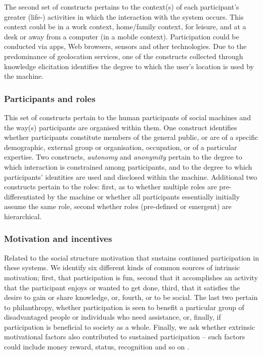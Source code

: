 \documentclass{sig-alternate}
\begin{document}
The second set of constructs pertains to the context(s) of each participant's greater (life-) activities in which the interaction with the system occurs. This context could be in a work context, home/family context, for leisure, and at a desk or away from a computer (in a mobile context). Participation could be conducted via apps, Web browsers, sensors and other technologies. Due to the predominance of geolocation services, one of the constructs collected through knowledge elicitation identifies the degree to which the user's location is used by the machine.

\subsubsection{Participants and roles}
This set of constructs pertain to the human participants of social machines and the way(s) participants are organised within them. One construct identifies whether participants constitute members of the general public, or are of a specific demographic, external group or organisation, occupation, or of a particular expertise. Two constructs, \emph{autonomy} and \emph{anonymity} pertain to the degree to which interaction is constrained among participants, and to the degree to which participants' identities are used and disclosed within the machine. Additional two constructs pertain to the roles: first, as to whether multiple roles are pre-differentiated by the machine or
whether all participants essentially initially assume the same role, second whether roles (pre-defined or emergent) are hierarchical.

\subsubsection{Motivation and incentives}
Related to the social structure motivation that sustains
continued participation in these systems. We identify six different
kinds of common sources of intrinsic motivation; first, that
participation is fun, second that it accomplishes an activity that the
participant enjoys or wanted to get done, third, that it satisfies the
desire to gain or share knowledge, or, fourth, or to be social. The
last two pertain to philanthropy, whether participation is seen to
benefit a particular group of disadvantaged people or individuals who
need assistance, or, finally, if participation is beneficial to
society as a whole. Finally, we ask whether extrinsic motivational
factors also contributed to sustained participation -- such factors
could include money reward, status, recognition and so on \cite{kuznetsov2006motivations,lakhani2003hackers,tagging}.
\end{document}
